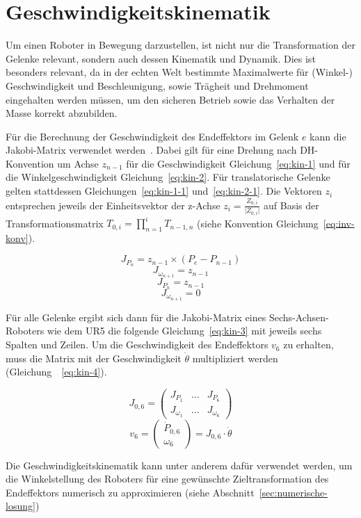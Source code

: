 \section{Geschwindigkeitskinematik}\label{sec:geschwindigkeitskinematik}

Um einen Roboter in Bewegung darzustellen, ist nicht nur die Transformation der Gelenke relevant, sondern auch dessen Kinematik und Dynamik.
Dies ist besonders relevant, da in der echten Welt bestimmte Maximalwerte für (Winkel-) Geschwindigkeit und Beschleunigung, sowie Trägheit und Drehmoment eingehalten werden müssen, um den sicheren Betrieb sowie das Verhalten der Masse korrekt abzubilden.

Für die Berechnung der Geschwindigkeit des Endeffektors im Gelenk $e$ kann die Jakobi-Matrix verwendet werden~\cite[105ff]{sicilianoRobotics2009}.
Dabei gilt für eine Drehung nach DH-Konvention um Achse $z_{n-1}$ für die Geschwindigkeit Gleichung~\ref{eq:kin-1} und für die Winkelgeschwindigkeit Gleichung~\ref{eq:kin-2}.
Für translatorische Gelenke gelten stattdessen Gleichungen~\ref{eq:kin-1-1} und~\ref{eq:kin-2-1}.
Die Vektoren $z_{i}$ entsprechen jeweils der Einheitsvektor der z-Achse $z_{i} = \frac{Z_{0,i}}{\lvert Z_{0,i} \rvert}$ auf Basis der Transformationsmatrix $T_{0,i} = \prod_{n=1}^{i}T_{n-1,n}$ (siehe Konvention Gleichung~\ref{eq:inv-konv}).

\begin{equation}
    J_{P_{n}} = z_{n-1} \times (P_{e} - P_{n-1}) \label{eq:kin-1}
\end{equation}
\begin{equation}
    J_{\omega_{n+1}} = z_{n-1} \label{eq:kin-2}
\end{equation}
\begin{equation}
    J_{P_{n}} = z_{n-1} \label{eq:kin-1-1}
\end{equation}
\begin{equation}
    J_{\omega_{n+1}} = 0 \label{eq:kin-2-1}
\end{equation}

Für alle Gelenke ergibt sich dann für die Jakobi-Matrix eines Sechs-Achsen-Roboters wie dem UR5 die folgende Gleichung~\ref{eq:kin-3} mit jeweils sechs Spalten und Zeilen.
Um die Geschwindigkeit des Endeffektors $v_6$ zu erhalten, muss die Matrix mit der Geschwindigkeit $\dot{\theta}$ multipliziert werden (Gleichung~~\ref{eq:kin-4}).

\begin{equation}
    J_{0,6}=
    \begin{pmatrix}
        J_{P_1}      & \dots & J_{P_6}      \\
        J_{\omega_1} & \dots & J_{\omega_6}
    \end{pmatrix}\label{eq:kin-3}
\end{equation}
\begin{equation}
    v_6 =
    \begin{pmatrix}
        \dot{P}_{0,6} \\ \omega_6
    \end{pmatrix} =
    J_{0,6}\cdot\dot{\theta}
    \label{eq:kin-4}
\end{equation}

Die Geschwindigkeitskinematik kann unter anderem dafür verwendet werden, um die Winkelstellung des Roboters für eine gewünschte Zieltransformation des Endeffektors numerisch zu approximieren (siehe Abschnitt~\ref{sec:numerische-losung})